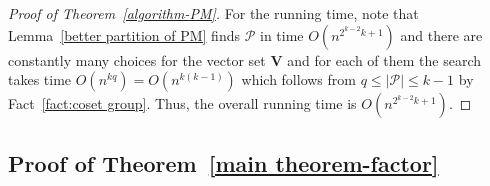 \documentclass[11pt, letterpaper]{amsart}
\theoremstyle{plain}
\numberwithin{equation}{section}
\theoremstyle{definition}
\newcommand\card[1]{\left| #1 \right|}
\renewcommand{\vec}[1]{{\mathbf #1}}
\begin{document}
\begin{proof}[Proof of Theorem~\ref{algorithm-PM}]
        
For the running time, note that Lemma~\ref{better partition of PM} finds $ \mathcal{P} $ in time $O(n^{2^{k-2}k+1})$ and there are constantly many choices for the vector set $\vec{V}$ and for each of them the search takes time $O(n^{kq})=O(n^{k(k-1)})$ %
which follows from \(q\le \card{\mathcal{P}}\le k-1\) by Fact~\ref{fact:coset group}. 
Thus, the overall running time is $O(n^{2^{k-2}k+1})$. 
    \end{proof}

    \subsection{Proof of Theorem~\ref{main theorem-factor} }
    

        
\end{document}
